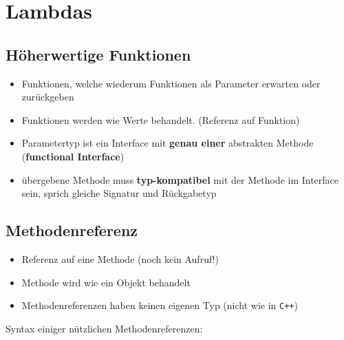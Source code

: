 \section*{Lambdas}
	\subsection*{Höherwertige Funktionen}
		\begin{itemize}[noitemsep]
			\item Funktionen, welche wiederum Funktionen als Parameter erwarten oder zurückgeben
			\item Funktionen werden wie Werte behandelt. (Referenz auf Funktion)
			\item Parametertyp ist ein Interface mit \textbf{genau einer} abstrakten Methode (\textbf{functional Interface})
			\item übergebene Methode muss \textbf{typ-kompatibel} mit der Methode im Interface sein, sprich gleiche Signatur und Rückgabetyp
		\end{itemize}
	
	\subsection*{Methodenreferenz}
		\begin{minipage}{6.3cm}
			\begin{itemize}[noitemsep]
				\item Referenz auf eine Methode (noch kein Aufruf!)
				\item Methode wird wie ein Objekt behandelt
				\item Methodenreferenzen haben keinen eigenen Typ (nicht wie in \texttt{C++})
			\end{itemize}
		\end{minipage}
		\hspace*{0.5cm}
		\begin{minipage}{12cm}
			
		\end{minipage}
		Syntax einiger nützlichen Methodenreferenzen:
		
